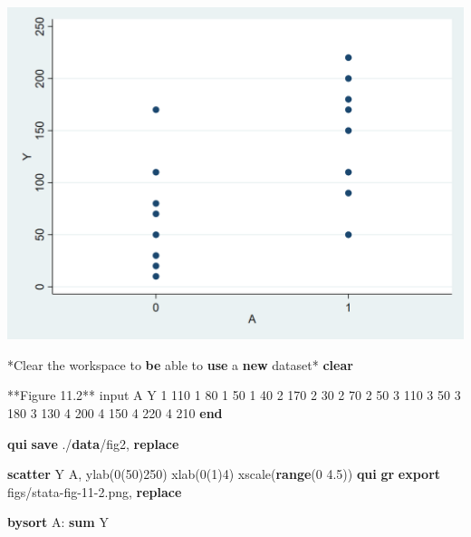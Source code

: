\documentclass[
  10pt,
]{book}
\newenvironment{Shaded}{\begin{snugshade}}{\end{snugshade}}
\newcommand{\BaseNTok}[1]{\textcolor[rgb]{0.00,0.00,0.81}{#1}}
\newcommand{\KeywordTok}[1]{\textcolor[rgb]{0.13,0.29,0.53}{\textbf{#1}}}
\newcommand{\NormalTok}[1]{#1}
\begin{document}
\begin{center}\includegraphics[width=0.85\linewidth]{figs/stata-fig-11-1} \end{center}

\begin{Shaded}
\begin{Highlighting}[]
\NormalTok{*Clear the workspace to }\KeywordTok{be}\NormalTok{ able to }\KeywordTok{use}\NormalTok{ a }\KeywordTok{new}\NormalTok{ dataset*}
\KeywordTok{clear}

\NormalTok{**Figure 11.2**}
\NormalTok{input A Y}
\NormalTok{1 110}
\NormalTok{1 80}
\NormalTok{1 50}
\NormalTok{1 40}
\NormalTok{2 170}
\NormalTok{2 30}
\NormalTok{2 70}
\NormalTok{2 50}
\NormalTok{3 110}
\NormalTok{3 50}
\NormalTok{3 180}
\NormalTok{3 130}
\NormalTok{4 200}
\NormalTok{4 150}
\NormalTok{4 220}
\NormalTok{4 210}
\KeywordTok{end}

\KeywordTok{qui} \KeywordTok{save}\NormalTok{ ./}\KeywordTok{data}\NormalTok{/fig2, }\KeywordTok{replace}

\KeywordTok{scatter}\NormalTok{ Y A, ylab(0(50)250) xlab(0(1)4) }\BaseNTok{xscale}\NormalTok{(}\KeywordTok{range}\NormalTok{(0 4.5))}
\KeywordTok{qui} \KeywordTok{gr} \KeywordTok{export}\NormalTok{ figs/stata{-}fig{-}11{-}2.png, }\KeywordTok{replace}

\KeywordTok{bysort}\NormalTok{ A: }\KeywordTok{sum}\NormalTok{ Y}
\end{Highlighting}
\end{Shaded}
\end{document}
